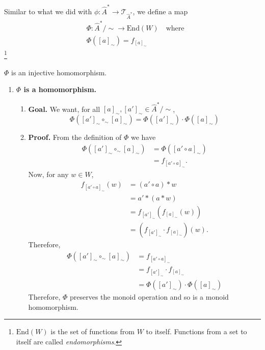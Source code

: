 Similar to what we did with $\phi: \hat{A}^{*} \to \mathcal{T}_{\hat{A}^{*}}$, we define a map
\begin{equation}
	\begin{aligned}
		 & \Phi : \hat{A}^{*}/\sim \to \text{End}(W) \quad \text{where} \\
		 & \Phi([a]_{\sim}) = f_{[a]_{\sim}}
	\end{aligned}
\end{equation}
\footnote{$\text{End}(W)$ is the set of functions from $W$ to itself.
	Functions from a set to itself are called \emph{endomorphisms}.}

\begin{propositionE}
    $\Phi$ is an injective homomorphism.
\end{propositionE}
\begin{proofE}
\begin{enumerate}
    \item \textbf{$\Phi$ is a homomorphism.}
    \begin{enumerate}
        \item \textbf{Goal.}
        We want, for all $[a]_{\sim}, [a']_{\sim} \in \hat{A}^{*}/\sim$,
        \begin{equation}
            \Phi([a']_{\sim} \circ_\sim [a]_{\sim}) = \Phi([a']_{\sim}) \cdot \Phi([a]_{\sim})
        \end{equation}
        
        \item \textbf{Proof.}
        From the definition of $\Phi$ we have
        \begin{align}
            \Phi([a']_{\sim} \circ_\sim [a]_{\sim}) & = \Phi([a' \circ a]_{\sim}) \\
            & = f_{[a' \circ a]_{\sim}}.
        \end{align}
        Now, for any $w \in W$,
        \begin{align}
            f_{[a' \circ a]_{\sim}}(w) & = (a' \circ a) \ast w \\
            & = a' \ast (a \ast w)  \\
            & = f_{[a']_{\sim}}(f_{[a]_{\sim}}(w)) \\
            & = (f_{[a']_{\sim}} \cdot f_{[a]_{\sim}})(w).
        \end{align}
        Therefore,
        \begin{align}
            \Phi([a']_{\sim} \circ_\sim [a]_{\sim}) & = f_{[a' \circ a]_{\sim}} \\
            & = f_{[a']_{\sim}} \cdot f_{[a]_{\sim}} \\
            & = \Phi([a']_{\sim}) \cdot \Phi([a]_{\sim})
        \end{align}
        Therefore, $\Phi$ preserves the monoid operation and so is a monoid homomorphism.
    \end{enumerate}
    

\end{enumerate}
\end{proofE}
